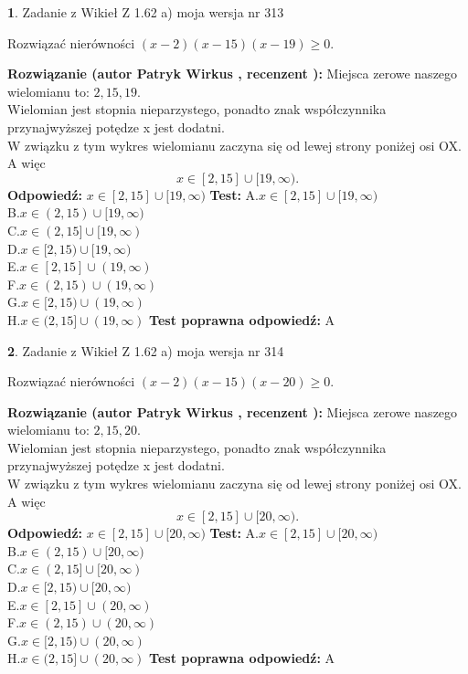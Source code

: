 \documentclass[12pt, a4paper]{article}
\theoremstyle{definition} %
\newtheorem{zad}{}
\newcommand{\zadStart}[1]{\begin{zad}#1\newline}
\newcommand{\zadStop}{\end{zad}}
\newcommand{\rozwStart}[2]{\noindent \textbf{Rozwiązanie (autor #1 , recenzent #2): }\newline}
\newcommand{\rozwStop}{\newline}
\newcommand{\odpStart}{\noindent \textbf{Odpowiedź:}\newline}
\newcommand{\odpStop}{\newline}
\newcommand{\testStart}{\noindent \textbf{Test:}\newline}
\newcommand{\testStop}{\newline}
\newcommand{\kluczStart}{\noindent \textbf{Test poprawna odpowiedź:}\newline}
\newcommand{\kluczStop}{\newline}
\begin{document}
\zadStart{Zadanie z Wikieł Z 1.62 a) moja wersja nr 313}

Rozwiązać nierówności $(x-2)(x-15)(x-19)\ge0$.
\zadStop
\rozwStart{Patryk Wirkus}{}
Miejsca zerowe naszego wielomianu to: $2, 15, 19$.\\
Wielomian jest stopnia nieparzystego, ponadto znak współczynnika przy\linebreak najwyższej potędze x jest dodatni.\\ W związku z tym wykres wielomianu zaczyna się od lewej strony poniżej osi OX. A więc $$x \in [2,15] \cup [19,\infty).$$
\rozwStop
\odpStart
$x \in [2,15] \cup [19,\infty)$
\odpStop
\testStart
A.$x \in [2,15] \cup [19,\infty)$\\
B.$x \in (2,15) \cup [19,\infty)$\\
C.$x \in (2,15] \cup [19,\infty)$\\
D.$x \in [2,15) \cup [19,\infty)$\\
E.$x \in [2,15] \cup (19,\infty)$\\
F.$x \in (2,15) \cup (19,\infty)$\\
G.$x \in [2,15) \cup (19,\infty)$\\
H.$x \in (2,15] \cup (19,\infty)$
\testStop
\kluczStart
A
\kluczStop



\zadStart{Zadanie z Wikieł Z 1.62 a) moja wersja nr 314}

Rozwiązać nierówności $(x-2)(x-15)(x-20)\ge0$.
\zadStop
\rozwStart{Patryk Wirkus}{}
Miejsca zerowe naszego wielomianu to: $2, 15, 20$.\\
Wielomian jest stopnia nieparzystego, ponadto znak współczynnika przy\linebreak najwyższej potędze x jest dodatni.\\ W związku z tym wykres wielomianu zaczyna się od lewej strony poniżej osi OX. A więc $$x \in [2,15] \cup [20,\infty).$$
\rozwStop
\odpStart
$x \in [2,15] \cup [20,\infty)$
\odpStop
\testStart
A.$x \in [2,15] \cup [20,\infty)$\\
B.$x \in (2,15) \cup [20,\infty)$\\
C.$x \in (2,15] \cup [20,\infty)$\\
D.$x \in [2,15) \cup [20,\infty)$\\
E.$x \in [2,15] \cup (20,\infty)$\\
F.$x \in (2,15) \cup (20,\infty)$\\
G.$x \in [2,15) \cup (20,\infty)$\\
H.$x \in (2,15] \cup (20,\infty)$
\testStop
\kluczStart
A
\kluczStop
\end{document}
